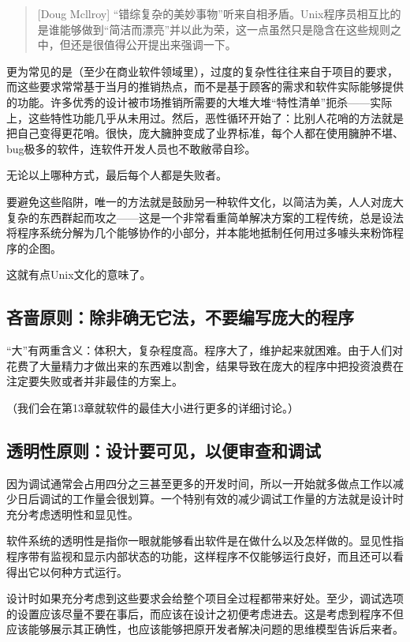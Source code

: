 \documentclass[12pt,oneside]{book}
\begin{document}
\begin{common-format}
\begin{quote}[Doug Mcllroy]
“错综复杂的美妙事物”听来自相矛盾。Unix程序员相互比的是谁能够做到“简洁而漂亮”并以此为荣，这一点虽然只是隐含在这些规则之中，但还是很值得公开提出来强调一下。
\end{quote}    

更为常见的是（至少在商业软件领域里），过度的复杂性往往来自于项目的要求，而这些要求常常基于当月的推销热点，而不是基于顾客的需求和软件实际能够提供的功能。许多优秀的设计被市场推销所需要的大堆大堆“特性清单”扼杀——实际上，这些特性功能几乎从未用过。然后，恶性循环开始了：比别人花哨的方法就是把自己变得更花哨。很快，庞大臃肿变成了业界标准，每个人都在使用臃肿不堪、bug极多的软件，连软件开发人员也不敢敝帚自珍。

无论以上哪种方式，最后每个人都是失败者。

要避免这些陷阱，唯一的方法就是鼓励另一种软件文化，以简洁为美，人人对庞大复杂的东西群起而攻之——这是一个非常看重简单解决方案的工程传统，总是设法将程序系统分解为几个能够协作的小部分，并本能地抵制任何用过多噱头来粉饰程序的企图。
    
这就有点Unix文化的意味了。


\subsection{吝啬原则：除非确无它法，不要编写庞大的程序}
“大”有两重含义：体积大，复杂程度高。程序大了，维护起来就困难。由于人们对花费了大量精力才做出来的东西难以割舍，结果导致在庞大的程序中把投资浪费在注定要失败或者并非最佳的方案上。

（我们会在第13章就软件的最佳大小进行更多的详细讨论。）

\subsection{透明性原则：设计要可见，以便审查和调试}
因为调试通常会占用四分之三甚至更多的开发时间，所以一开始就多做点工作以减少日后调试的工作量会很划算。一个特别有效的减少调试工作量的方法就是设计时充分考虑透明性和显见性。

软件系统的透明性是指你一眼就能够看出软件是在做什么以及怎样做的。显见性指程序带有监视和显示内部状态的功能，这样程序不仅能够运行良好，而且还可以看得出它以何种方式运行。

设计时如果充分考虑到这些要求会给整个项目全过程都带来好处。至少，调试选项的设置应该尽量不要在事后，而应该在设计之初便考虑进去。这是考虑到程序不但应该能够展示其正确性，也应该能够把原开发者解决问题的思维模型告诉后来者。


\end{common-format}
\end{document}
